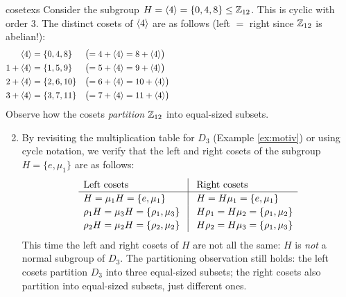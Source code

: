 \begin{examples}{}{cosetexs}
	\exstart\label{ex:cosets1} Consider the subgroup $H=\left\langle 4\right\rangle=\{0,4,8\}\le\mathbb{Z}_{12}$. This is cyclic with order 3. The distinct cosets of $\left\langle 4\right\rangle$ are as follows (left $=$ right since $\mathbb{Z}_{12}$ is abelian!):
	\begin{align*}
		\ip 4 &=\{0,4,8\}&&\bigl(=4+\ip 4=8+\ip 4\bigr) \hspace{220pt}\\
		1+\ip 4 &=\{1,5,9\}&&\bigl(=5+\ip 4=9+\ip 4\bigr)\\
		2+\ip 4 &=\{2,6,10\}&&\bigl(=6+\ip 4=10+\ip 4\bigr)\\
		3+\ip 4 &=\{3,7,11\}&&\bigl(=7+\ip 4=11+\ip 4\bigr)
	\end{align*}
	Observe how the cosets \emph{partition} $\mathbb{Z}_{12}$ into equal-sized subsets.

	\begin{enumerate}\setcounter{enumi}{1}
		\item\label{ex:nonnormalcosets} By revisiting the multiplication table for $D_3$ (Example \ref{ex:motiv}) or using cycle notation, we verify that the left and right cosets of the subgroup $H=\{e,\mu_1\}$ are as follows:
		\[
			\renewcommand{\arraystretch}{1.15}
			\begin{array}{l@{\hspace*{.3cm}}|@{\hspace*{.3cm}}l}
		  	\text{Left cosets} & \text{Right cosets}\\\hline
				H=\mu_1H=\{e,\mu_1\}& H=H\mu_1=\{e,\mu_1\}\\
				\rho_1H=\mu_3H=\{\rho_1,\mu_3\} & H\rho_1=H\mu_2=\{\rho_1,\mu_2\}\\
				\rho_2H=\mu_2H=\{\rho_2,\mu_2\} & H\rho_2=H\mu_3=\{\rho_1,\mu_3\}
			\end{array}
		\]
		This time the left and right cosets of $H$ are not all the same: $H$ is \emph{not} a normal subgroup of $D_3$. The partitioning observation still holds: the left cosets partition $D_3$ into three equal-sized subsets; the right cosets also partition into equal-sized subsets, just different ones.
	

\end{enumerate}
\end{examples}
